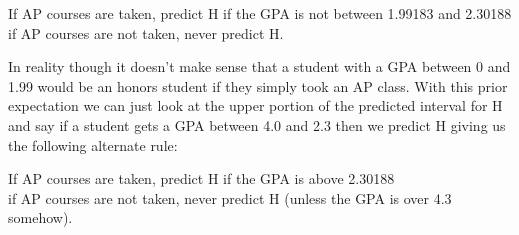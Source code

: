 \documentclass[12pt]{article}
\begin{document}
\begin{enumerate}
If AP courses are taken, predict H if the GPA is not between 1.99183 and 2.30188 \\
if AP courses are not taken, never predict H.

In reality though it doesn't make sense that a student with a GPA between 0 and 1.99 would be an honors student if they simply took an AP class. With this prior expectation we can just look at the upper portion of the predicted interval for H and say if a student gets a GPA between 4.0 and 2.3 then we predict H giving us the following alternate rule:

If AP courses are taken, predict H if the GPA is above 2.30188 \\
if AP courses are not taken, never predict H (unless the GPA is over 4.3 somehow).
 
\end{enumerate}
\end{document}
